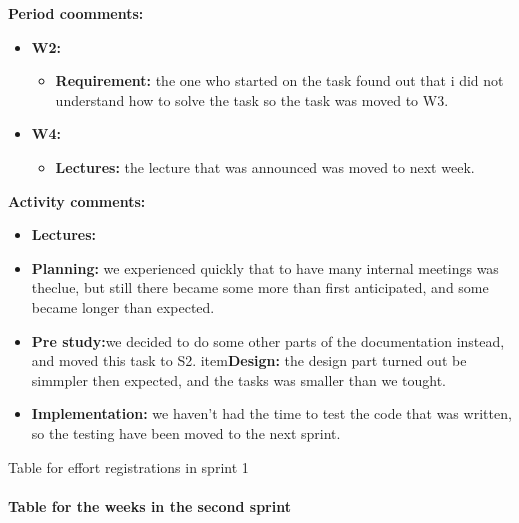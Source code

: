 \begin{table}
\textbf{Period coomments:}
\begin{itemize}
\item{}\textbf{W2:} 
\begin{itemize}
\item{}\textbf{Requirement:} the one who started on the task found out that i did not understand how to solve the task so the task was moved to W3. 
\end{itemize}
\item{}\textbf{W4:}
\begin{itemize}
\item{} \textbf{Lectures:} the lecture that was announced was moved to next week. 
\end{itemize}
\end{itemize}


\textbf{Activity comments:}
\begin{itemize}
\item{} \textbf{Lectures:} 
\item{}\textbf{Planning:} we experienced quickly that to have many internal meetings was theclue, but still there became some more than first anticipated, and some became longer than expected. 
\item{}\textbf{Pre study:}we decided to do some other parts of the documentation instead, and moved this task to S2. item{}\textbf{Design:} the design part turned out be simmpler then expected, and the tasks was smaller than we tought. \item{}\textbf{Implementation:} we haven't had the time to test the code that was written, so the testing have been moved to the next sprint.
\end{itemize}
\caption{Table for effort registrations in sprint 1} \label{tab:effortweekss1}
\end{table}

\paragraph{Table for the weeks in the second sprint}\hfill

